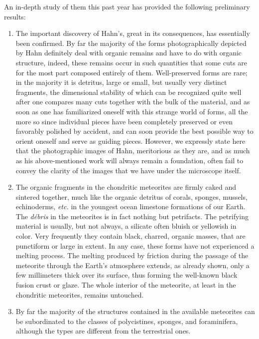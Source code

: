 \documentclass[a4paper, 12pt, oneside]{article}
\begin{document}
An in-depth study of them this past year has provided the following preliminary results:
\begin{enumerate}
\item The important discovery of Hahn's, great in its consequences, has essentially been confirmed. By far the majority of the forms photographically depicted by Hahn definitely deal with organic remains and have to do with organic structure, indeed, these remains occur in such quantities that some cuts are for the most part composed entirely of them. Well-preserved forms are rare; in the majority it is detritus, large or small, but usually very distinct fragments, the dimensional stability of which can be recognized quite well after one compares many cuts together with the bulk of the material, and as soon as one has familiarized oneself with this strange world of forms, all the more so since individual pieces have been completely preserved or even favorably polished by accident, and can soon provide the best possible way to orient oneself and serve as guiding pieces. However, we expressly state here that the photographic images of Hahn, meritorious as they are, and as much as his above-mentioned work will always remain a foundation, often fail to convey the clarity of the images that we have under the microscope itself.

\item The organic fragments in the chondritic meteorites are firmly caked and sintered together, much like the organic detritus of corals, sponges, mussels, echinoderms, \emph{etc.} in the youngest ocean limestone formations of our Earth. The \emph{débris} in the meteorites is in fact nothing but petrifacts. The petrifying material is usually, but not always, a silicate often bluish or yellowish in color. Very frequently they contain black, charred, organic masses, that are punctiform or large in extent. In any case, these forms have not experienced a melting process. The melting produced by friction during the passage of the meteorite through the Earth's atmosphere extends, as already shown, only a few millimeters thick over its surface, thus forming the well-known black fusion crust or glaze. The whole interior of the meteorite, at least in the chondritic meteorites, remains untouched.

\item By far the majority of the structures contained in the available meteorites can be subordinated to the classes of polycistines, sponges, and foraminifera, although the types are different from the terrestrial ones.


\end{enumerate}
\end{document}
